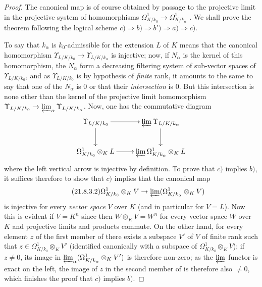 \begin{proof}
The canonical map  is of course obtained by passage to the projective limit in the projective system of homomorphisms $\Omega^1_{K/k_0}\to\Omega^1_{K/k_\alpha}$ .
We shall prove the theorem following the logical scheme $c)\Rightarrow b)\Rightarrow b')\Rightarrow a)\Rightarrow c)$.

To say that $k_\alpha$ is $k_0$-admissible for the extension $L$ of $K$ means that the
canonical homomorphism $\Upsilon_{L/K/k_0}\to\Upsilon_{L/K/k_\alpha}$ is injective; now, if $N_\alpha$ is the kernel of this homomorphism, the $N_\alpha$ form a decreasing filtering system of sub-vector spaces of $\Upsilon_{L/K/k_0}$, and as $\Upsilon_{L/K/k_0}$ is by hypothesis of \emph{finite} rank, it amounts to the same to say that one of the $N_\alpha$ is $0$ or that their \emph{intersection} is $0$.
But this intersection is none other than the kernel of the projective limit homomorphism $\Upsilon_{L/K/k_0}\to\varprojlim_\alpha\Upsilon_{L/K/k_\alpha}$.
Now, one has the commutative diagram
\[
  \xymatrix{
    \Upsilon_{L/K/k_0}\ar[r]\ar[d] & \varprojlim\Upsilon_{L/K/k_\alpha}\ar[d]\\
    \Omega^1_{K/k_0}\otimes_K L\ar[r] & \varprojlim\Omega^1_{K/k_\alpha}\otimes_K L
  }
\]
where the left vertical arrow is injective by definition.
To prove that $c)$ implies $b)$, it suffices therefore to show that $c)$ implies that the canonical map
\begin{equation}
\tag{21.8.3.2}
  \label{0.21.8.3.2}
  \Omega^1_{K/k_0}\otimes_K V\to\varprojlim(\Omega^1_{K/k_\alpha}\otimes_K V)
\end{equation}
is injective for every \emph{vector space} $V$ over $K$ (and in particular for $V=L$).
Now this is evident if $V=K^n$ since then $W\otimes_K V=W^n$ for every vector space $W$ over $K$ and projective limits and products commute.
On the other hand, for every element $z$ of the first member of  there exists a subspace $V'$ of $V$ of finite rank such that $z\in\Omega^1_{K/k_0}\otimes_K V'$ (identified canonically with a subspace of $\Omega^1_{K/k_0}\otimes_K V$); if $z\neq 0$, its image in $\varprojlim_\alpha(\Omega^1_{K/k_\alpha}\otimes_K V')$ is therefore non-zero; as the $\varprojlim$ functor is exact on the left, the image of $z$ in the second member of  is therefore also $\neq 0$, which finishes the proof that $c)$ implies $b)$.


\end{proof}
